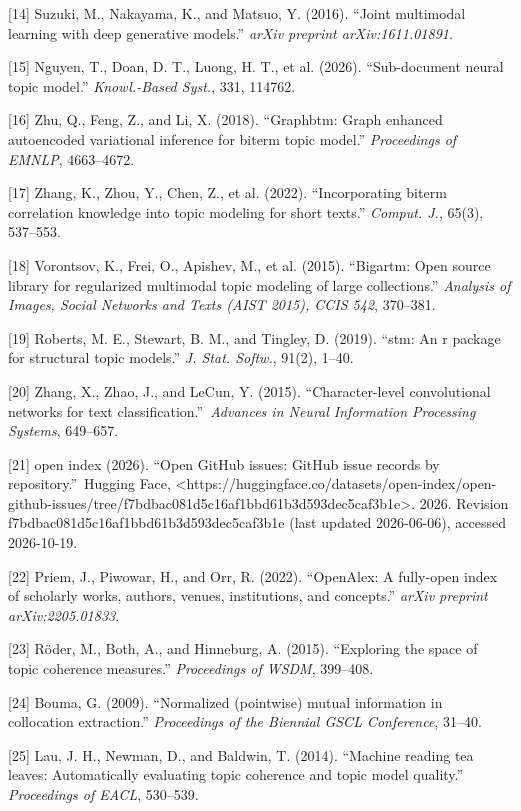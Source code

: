 \documentclass{article}
\begin{document}
[14] Suzuki, M., Nakayama, K., and Matsuo, Y. (2016). ``Joint multimodal learning with deep generative models.'' {\em arXiv preprint arXiv:1611.01891}.

[15] Nguyen, T., Doan, D. T., Luong, H. T., et al. (2026). ``Sub-document neural topic model.'' \emph{Knowl.-Based Syst.}, 331, 114762.

[16] Zhu, Q., Feng, Z., and Li, X. (2018). ``Graphbtm: Graph enhanced autoencoded variational inference for biterm topic model.'' \emph{Proceedings of EMNLP}, 4663--4672.

[17] Zhang, K., Zhou, Y., Chen, Z., et al. (2022). ``Incorporating biterm correlation knowledge into topic modeling for short texts.'' \emph{Comput. J.}, 65(3), 537--553.

[18] Vorontsov, K., Frei, O., Apishev, M., et al. (2015). ``Bigartm: Open source library for regularized multimodal topic modeling of large collections.'' \emph{Analysis of Images, Social Networks and Texts (AIST 2015), CCIS 542}, 370--381.

[19] Roberts, M. E., Stewart, B. M., and Tingley, D. (2019). ``stm: An r package for structural topic models.'' \emph{J. Stat. Softw.}, 91(2), 1--40.

[20] Zhang, X., Zhao, J., and LeCun, Y. (2015). ``Character-level convolutional networks for text classification.''\ \emph{Advances in Neural Information Processing Systems}, 649--657.

[21] open index (2026). ``Open {GitHub} issues: {GitHub} issue records by repository.''\ Hugging Face, <https://huggingface.co/datasets/open-index/open-github-issues/tree/f7bdbac081d5c16af1bbd61b3d593dec5caf3b1e>. 2026. Revision f7bdbac081d5c16af1bbd61b3d593dec5caf3b1e (last updated 2026-06-06), accessed 2026-10-19.

[22] Priem, J., Piwowar, H., and Orr, R. (2022). ``{OpenAlex}: A fully-open index of scholarly works, authors, venues, institutions, and concepts.'' \emph{arXiv preprint arXiv:2205.01833}.

[23] R\"oder, M., Both, A., and Hinneburg, A. (2015). ``Exploring the space of topic coherence measures.'' {\em Proceedings of WSDM}, 399--408.

[24] Bouma, G. (2009). ``Normalized (pointwise) mutual information in collocation extraction.'' \emph{Proceedings of the Biennial GSCL Conference}, 31--40.

[25] Lau, J. H., Newman, D., and Baldwin, T. (2014). ``Machine reading tea leaves: Automatically evaluating topic coherence and topic model quality.'' \emph{Proceedings of EACL}, 530--539.
\end{document}
